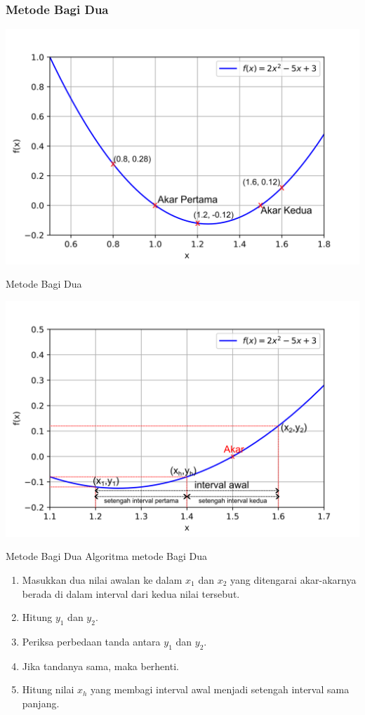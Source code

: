 \documentclass[pdflatex,compress,mathserif]{beamer}
\begin{document}
\begin{frame}
	\frametitle{Metode Bagi Dua}
	\begin{center}
		\includegraphics[width=\linewidth]{img/01}
	\end{center}
\end{frame}

\begin{frame}{Metode Bagi Dua}
	\begin{center}
		\includegraphics[width=\linewidth]{img/02}
	\end{center}
\end{frame}

\begin{frame}{Metode Bagi Dua}
	Algoritma metode Bagi Dua
	\begin{enumerate}
		\item Masukkan dua nilai awalan ke dalam $ x_1 $ dan $ x_2 $ yang ditengarai akar-akarnya berada di dalam interval dari kedua nilai tersebut.
		\item Hitung $ y_1 $ dan $ y_2 $.
		\item Periksa perbedaan tanda antara $ y_1 $ dan $ y_2 $.
		\item Jika tandanya sama, maka berhenti.
		\item Hitung nilai $ x_h $ yang membagi interval awal menjadi setengah interval sama panjang.
	\end{enumerate}
\end{frame}
\end{document}
